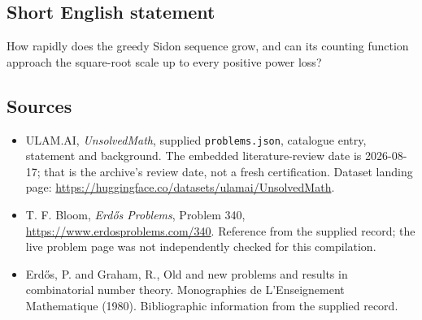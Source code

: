 \documentclass[11pt,a4paper]{article}
\begin{document}
\subsection{Short English statement}

How rapidly does the greedy Sidon sequence grow, and can its counting function approach the square-root scale up to every positive power loss?

\subsection{Sources}

{\small

\begin{itemize}

\item[\hypertarget{source:statement:1}{S1}] ULAM.AI, \emph{UnsolvedMath}, supplied \texttt{problems.json}, catalogue entry, statement and background. The embedded literature-review date is 2026-08-17; that is the archive’s review date, not a fresh certification. Dataset landing page: \url{https://huggingface.co/datasets/ulamai/UnsolvedMath}.

\item[\hypertarget{source:statement:2}{S2}] T. F. Bloom, \emph{Erdős Problems}, Problem 340, \url{https://www.erdosproblems.com/340}. Reference from the supplied record; the live problem page was not independently checked for this compilation.

\item[\hypertarget{source:statement:3}{S3}] Erd\H{o}s, P. and Graham, R., Old and new problems and results in combinatorial number theory. Monographies de L'Enseignement Mathematique (1980). Bibliographic information from the supplied record.

\end{itemize}

}

\label{end:statement}
\end{document}
